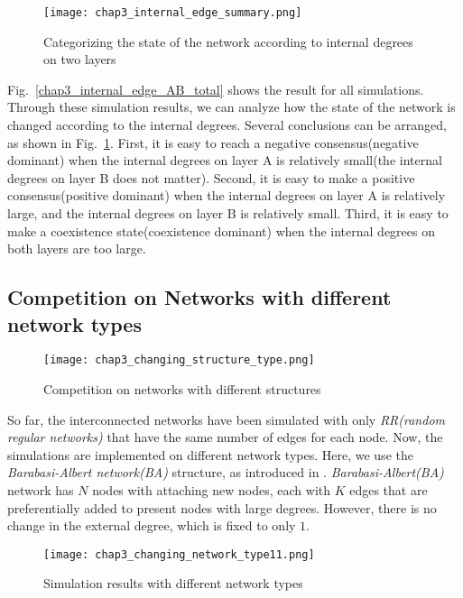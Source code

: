 \begin{figure}[!htb]
	\centering
	\texttt{[image: chap3\_internal\_edge\_summary.png]}
	\caption{Categorizing the state of the network according to internal degrees on two layers}
	\label{chap3_internal_edge_summary}
\end{figure}

Fig.~\ref{chap3_internal_edge_AB_total} shows the result for all simulations. Through these simulation results, we can analyze how the state of the network is changed according to the internal degrees. Several conclusions can be arranged, as shown in Fig.~\ref{chap3_internal_edge_summary}.  First, it is easy to reach a negative consensus(negative dominant) when the internal degrees on layer A is relatively small(the internal degrees on layer B does not matter). Second, it is easy to make a positive consensus(positive dominant) when the internal degrees on layer A is relatively large, and the internal degrees on layer B is relatively small. Third, it is easy to make a coexistence state(coexistence dominant) when the internal degrees on both layers are too large. \\ 


\subsection{Competition on Networks with different network types}

\begin{figure}[!htb]
	\centering
	\texttt{[image: chap3\_changing\_structure\_type.png]}
	\caption{Competition on networks with different structures}
	\label{chap3_changing_structure_type}
\end{figure}

So far, the interconnected networks have been simulated with only \textit{RR(random regular networks)} that have the same number of edges for each node. Now, the simulations are implemented on different network types. Here, we use the \textit{Barabasi-Albert network(BA)} structure, as introduced in \parencite{barabasi1999}. \textit{Barabasi-Albert(BA)} network has $N$ nodes with attaching new nodes, each with $K$ edges that are preferentially added to present nodes with large degrees. However, there is no change in the external degree, which is fixed to only $1$.

\begin{figure}[!htb]
	\centering
	\texttt{[image: chap3\_changing\_network\_type11.png]}
	\caption{Simulation results with different network types}
	\label{chap3_changing_network_type1}
\end{figure}

